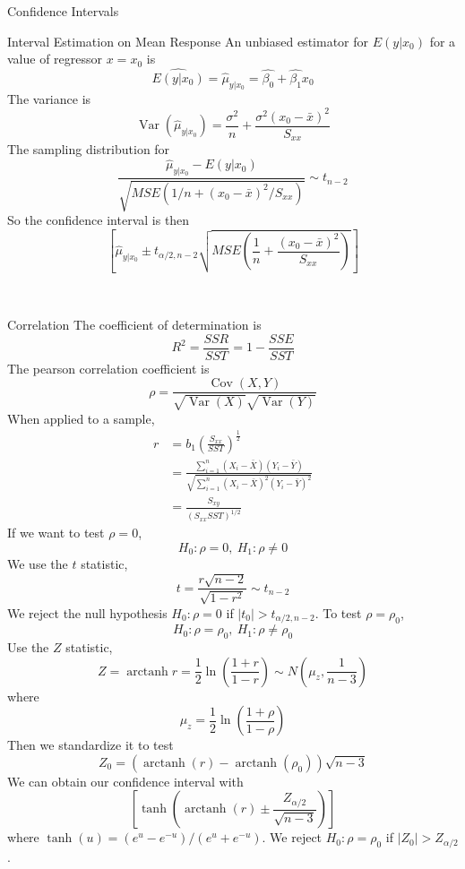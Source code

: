 \documentclass{article}
\DeclareMathOperator{\Var}{Var}
\DeclareMathOperator{\Cov}{Cov}
\DeclareMathOperator{\atanh}{arctanh}
\begin{document}
\begin{multicols*}{3}
\begin{blackbox}{Confidence Intervals}
\begin{brownbox}{Interval Estimation on Mean Response}
            An unbiased estimator for $E(y|x_0)$ for a value of regressor $x=x_0$ is 
            \[\widehat{E(y|x_0)} = \hat{\mu}_{y|x_0} = \hat{\beta_0} + \hat{\beta_1}x_0\]
            The variance is 
            \[\Var(\hat{\mu}_{y|x_0}) = \frac{\sigma^2}{n} + \frac{\sigma^2(x_0-\bar{x})^2}{S_{xx}}\]
            The sampling distribution for 
            \[\frac{\hat{\mu}_{y|x_0} - E(y|x_0)}{\sqrt{MSE(1/n + (x_0-\bar{x})^2/S_{xx})}} \sim t_{n-2}\]
            So the confidence interval is then 
            \[\left[\hat{\mu}_{y|x_0} \pm t_{\alpha/2, n-2}\sqrt{MSE\left(\frac{1}{n} + \frac{(x_0 - \bar{x})^2}{S_{xx}}\right)} \right]\]
        \end{brownbox}\\[-2ex]
    \end{blackbox}
    \begin{blackbox}{Correlation}
        The coefficient of determination is 
        \[R^2 = \frac{SSR}{SST} = 1 - \frac{SSE}{SST}\]
        The pearson correlation coefficient is 
        \[\rho = \frac{\Cov(X,Y)}{\sqrt{\Var(X)}\sqrt{\Var(Y)}}\]
        When applied to a sample, 
        \begin{align*}
            r &= b_1\left(\frac{S_{xx}}{SST}\right)^{\frac{1}{2}}\\
              &= \frac{\sum_{i=1}^n(X_i - \bar{X})(Y_i - \bar{Y})}{\sqrt{\sum_{i=1}^n (X_i - \bar{X})^2(Y_i - \bar{Y})^2}}\\
              &= \frac{S_{xy}}{(S_{xx}SST)^{1/2}}  
        \end{align*}
        If we want to test $\rho = 0$, 
        \[H_0: \rho = 0, \ H_1: \rho \neq 0\]
        We use the $t$ statistic,
        \[t = \frac{r\sqrt{n-2}}{\sqrt{1-r^2}} \sim t_{n-2}\]
        We reject the null hypothesis $H_0: \rho = 0$ if $|t_0| > t_{\alpha/2, n-2}$. To test $\rho = \rho_0$, 
        \[H_0: \rho = \rho_0, \ H_1: \rho \neq \rho_0\]
        Use the $Z$ statistic, 
        \[Z = \atanh r = \frac{1}{2}\ln\left(\frac{1+r}{1-r}\right) \sim N\left(\mu_z, \frac{1}{n-3}\right)\]
        where 
        \[\mu_z = \frac{1}{2}\ln\left(\frac{1+\rho}{1-\rho}\right)\]
        Then we standardize it to test 
        \[Z_0 = (\atanh(r) - \atanh(\rho_0))\sqrt{n-3}\]
        We can obtain our confidence interval with 
        \[\left[\tanh\left(\atanh(r) \pm \frac{Z_{\alpha/2}}{\sqrt{n-3}}\right)\right]\]
        where $\tanh(u) = (e^u-e^{-u})/(e^u + e^{-u})$. We reject $H_0: \rho = \rho_0$ if $|Z_0| > Z_{\alpha/2}$.
    \end{blackbox}
\end{multicols*}
\end{document}
